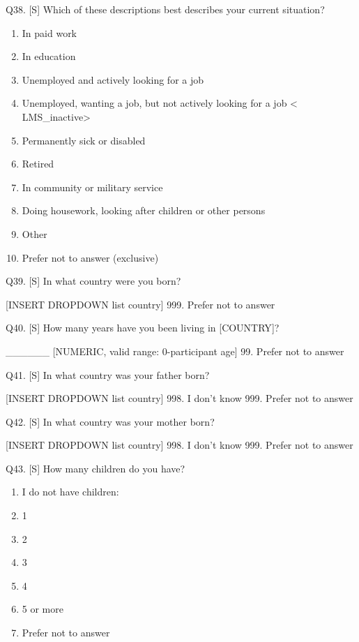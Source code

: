 \documentclass[
  12pt,
  a4paper,
]{article}
\providecommand{\tightlist}{%
  \setlength{\itemsep}{0pt}\setlength{\parskip}{0pt}}
\begin{document}
Q38. {[}S{]} Which of these descriptions best describes your current situation?

\begin{enumerate}
\def\labelenumi{\arabic{enumi}.}
\tightlist
\item
  In paid work
\item
  In education
\item
  Unemployed and actively looking for a job
\item
  Unemployed, wanting a job, but not actively looking for a job \textless{} LMS\_inactive\textgreater{}
\item
  Permanently sick or disabled
\item
  Retired
\item
  In community or military service
\item
  Doing housework, looking after children or other persons
\item
  Other
\item
  Prefer not to answer (exclusive)
\end{enumerate}

Q39. {[}S{]} In what country were you born?

{[}INSERT DROPDOWN list country{]}
999. Prefer not to answer

Q40. {[}S{]} How many years have you been living in {[}COUNTRY{]}?

\_\_\_\_\_\_ {[}NUMERIC, valid range: 0-participant age{]}
99. Prefer not to answer

Q41. {[}S{]} In what country was your father born?

{[}INSERT DROPDOWN list country{]}
998. I don't know
999. Prefer not to answer

Q42. {[}S{]} In what country was your mother born?

{[}INSERT DROPDOWN list country{]}
998. I don't know
999. Prefer not to answer

Q43. {[}S{]} How many children do you have?

\begin{enumerate}
\def\labelenumi{\arabic{enumi}.}
\tightlist
\item
  I do not have children:\\
\item
  1
\item
  2\\
\item
  3\\
\item
  4\\
\item
  5 or more\\
\item
  Prefer not to answer
\end{enumerate}
\end{document}
